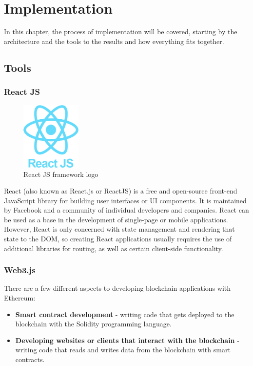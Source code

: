 \chapter{Implementation}

In this chapter, the process of implementation will be covered, starting by the architecture and the tools to the results and how everything fits together.

\section{Tools}
\subsection{React JS}

\begin{figure}
	\vspace{-10pt}
	\includegraphics[width=3cm]{images/chapter3/logo-react-js.png}
	\vspace{-10pt}
	\caption{{\footnotesize React JS framework logo}}
\end{figure}

React (also known as React.js or ReactJS) is a free and open-source front-end JavaScript library\cite{ReactJavaScriptLibrary} for building user interfaces or UI components. It is maintained by Facebook and a community of individual developers and companies.\cite{ReactMakingFaster} React can be used as a base in the development of single-page or mobile applications. However, React is only concerned with state management and rendering that state to the DOM, so creating React applications usually requires the use of additional libraries for routing, as well as certain client-side functionality.

\subsection{Web3.js}

There are a few different aspects to developing blockchain applications with Ethereum:

\begin{itemize}
\item \textbf{Smart contract development} - writing code that gets deployed to the blockchain with the Solidity programming language.
\item \textbf{Developing websites or clients that interact with the blockchain} - writing code that reads and writes data from the blockchain with smart contracts.
\end{itemize}

